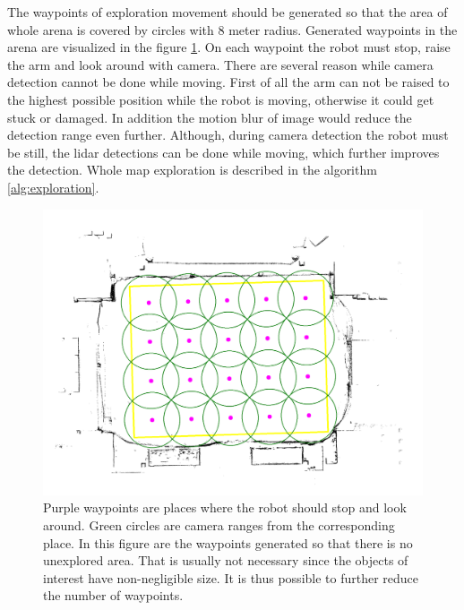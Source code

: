  The waypoints of exploration movement should be generated so that the area of whole arena is covered by circles with 8 meter radius. Generated waypoints in the arena are visualized in the figure \ref{fig:map_annot}. On each waypoint the robot must stop, raise the arm and look around with camera. There are several reason while camera detection cannot be done while moving. First of all the arm can not be raised to the highest possible position while the robot is moving, otherwise it could get stuck or damaged. In addition the motion blur of image would reduce the detection range even further. Although, during camera detection the robot must be still, the lidar detections can be done while moving, which further improves the detection. Whole map exploration is described in the algorithm \ref{alg:exploration}.

\begin{figure}[H]
	\centering
	\includegraphics[scale=0.25]{fig/map_annotation.png}
	\caption[Generated waypoints]{Purple waypoints are places where the robot should stop and look around. Green circles are camera ranges from the corresponding place. In this figure are the waypoints generated so that there is no unexplored area. That is usually not necessary since the objects of interest have non-negligible size. It is thus possible to further reduce the number of waypoints.}
	\label{fig:map_annot}
\end{figure}

